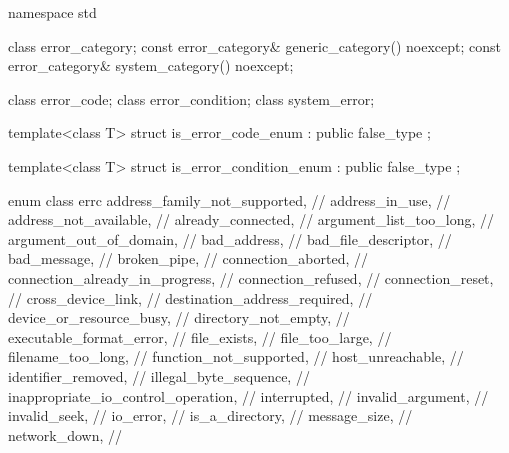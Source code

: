 \begin{codeblock}
namespace std {
  class error_category;
  const error_category& generic_category() noexcept;
  const error_category& system_category() noexcept;

  class error_code;
  class error_condition;
  class system_error;

  template<class T>
    struct is_error_code_enum : public false_type {};

  template<class T>
    struct is_error_condition_enum : public false_type {};

  enum class errc {
    address_family_not_supported,       // 
    address_in_use,                     // 
    address_not_available,              // 
    already_connected,                  // 
    argument_list_too_long,             // 
    argument_out_of_domain,             // 
    bad_address,                        // 
    bad_file_descriptor,                // 
    bad_message,                        // 
    broken_pipe,                        // 
    connection_aborted,                 // 
    connection_already_in_progress,     // 
    connection_refused,                 // 
    connection_reset,                   // 
    cross_device_link,                  // 
    destination_address_required,       // 
    device_or_resource_busy,            // 
    directory_not_empty,                // 
    executable_format_error,            // 
    file_exists,                        // 
    file_too_large,                     // 
    filename_too_long,                  // 
    function_not_supported,             // 
    host_unreachable,                   // 
    identifier_removed,                 // 
    illegal_byte_sequence,              // 
    inappropriate_io_control_operation, // 
    interrupted,                        // 
    invalid_argument,                   // 
    invalid_seek,                       // 
    io_error,                           // 
    is_a_directory,                     // 
    message_size,                       // 
    network_down,                       // 
}}
\end{codeblock}
